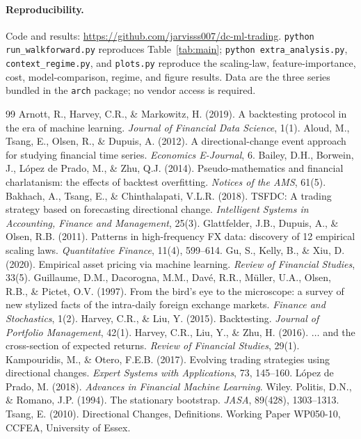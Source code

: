 \documentclass[11pt]{article}
\begin{document}
\paragraph{Reproducibility.} Code and results:
\url{https://github.com/jarvisss007/dc-ml-trading}.
\texttt{python run\_walkforward.py} reproduces Table~\ref{tab:main};
\texttt{python extra\_analysis.py}, \texttt{context\_regime.py}, and
\texttt{plots.py} reproduce the scaling-law, feature-importance, cost,
model-comparison, regime, and figure results. Data are the three series bundled
in the \texttt{arch} package; no vendor access is required.

\begin{thebibliography}{99}
 Arnott, R., Harvey, C.R., \& Markowitz, H. (2019). A backtesting protocol in the era of machine learning. \emph{Journal of Financial Data Science}, 1(1).
 Aloud, M., Tsang, E., Olsen, R., \& Dupuis, A. (2012). A directional-change event approach for studying financial time series. \emph{Economics E-Journal}, 6.
 Bailey, D.H., Borwein, J., L\'opez de Prado, M., \& Zhu, Q.J. (2014). Pseudo-mathematics and financial charlatanism: the effects of backtest overfitting. \emph{Notices of the AMS}, 61(5).
 Bakhach, A., Tsang, E., \& Chinthalapati, V.L.R. (2018). TSFDC: A trading strategy based on forecasting directional change. \emph{Intelligent Systems in Accounting, Finance and Management}, 25(3).
 Glattfelder, J.B., Dupuis, A., \& Olsen, R.B. (2011). Patterns in high-frequency FX data: discovery of 12 empirical scaling laws. \emph{Quantitative Finance}, 11(4), 599--614.
 Gu, S., Kelly, B., \& Xiu, D. (2020). Empirical asset pricing via machine learning. \emph{Review of Financial Studies}, 33(5).
 Guillaume, D.M., Dacorogna, M.M., Dav\'e, R.R., M\"uller, U.A., Olsen, R.B., \& Pictet, O.V. (1997). From the bird's eye to the microscope: a survey of new stylized facts of the intra-daily foreign exchange markets. \emph{Finance and Stochastics}, 1(2).
 Harvey, C.R., \& Liu, Y. (2015). Backtesting. \emph{Journal of Portfolio Management}, 42(1).
 Harvey, C.R., Liu, Y., \& Zhu, H. (2016). $\ldots$ and the cross-section of expected returns. \emph{Review of Financial Studies}, 29(1).
 Kampouridis, M., \& Otero, F.E.B. (2017). Evolving trading strategies using directional changes. \emph{Expert Systems with Applications}, 73, 145--160.
 L\'opez de Prado, M. (2018). \emph{Advances in Financial Machine Learning}. Wiley.
 Politis, D.N., \& Romano, J.P. (1994). The stationary bootstrap. \emph{JASA}, 89(428), 1303--1313.
 Tsang, E. (2010). Directional Changes, Definitions. Working Paper WP050-10, CCFEA, University of Essex.
\end{thebibliography}
\end{document}
